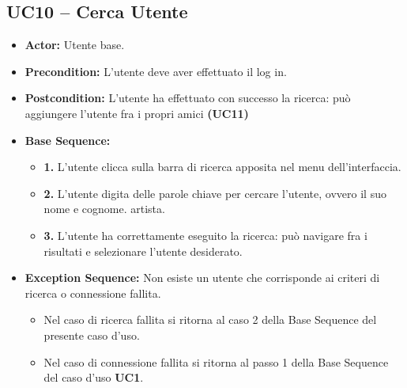 \subsection{UC10 -- Cerca Utente}
\begin{itemize}
    \item \textbf{Actor:} Utente base.
    \item \textbf{Precondition:} L'utente deve aver effettuato il log in.
    \item \textbf{Postcondition:} L'utente ha effettuato con successo la ricerca: può aggiungere l'utente fra i propri amici \textbf{(UC11)}
    \item \textbf{Base Sequence:}
    \begin{itemize}
        \item \textbf{1.} L'utente clicca sulla barra di ricerca apposita nel menu dell'interfaccia.
        \item \textbf{2.} L'utente digita delle parole chiave per cercare l'utente, ovvero il suo nome e cognome.
        artista.
        \item \textbf{3.} L'utente ha correttamente eseguito la ricerca: può navigare fra i risultati e selezionare l'utente desiderato.
    \end{itemize}
    \item \textbf{Exception Sequence:} Non esiste un utente che corrisponde ai criteri di ricerca o connessione fallita.
    \begin{itemize}
        \item Nel caso di ricerca fallita si ritorna al caso 2 della Base Sequence del presente caso d'uso.
        \item Nel caso di connessione fallita si ritorna al passo 1 della Base Sequence del caso d'uso \textbf{UC1}.
    \end{itemize}
\end{itemize}
\vspace{1cm}

